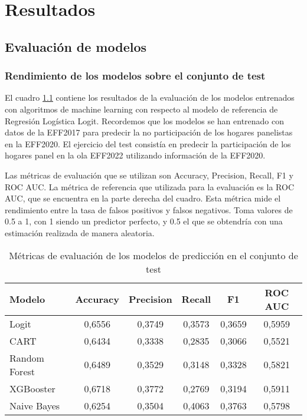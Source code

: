 \chapter{Resultados}
\label{chapter:resultados}

\section{Evaluación de modelos}
\label{section:evaluation_models}

\subsection*{Rendimiento de los modelos sobre el conjunto de test}
El cuadro \ref{table:test} contiene los resultados de la evaluación de los modelos entrenados con algoritmos de machine learning con respecto al modelo de referencia de Regresión Logística Logit. Recordemos que los modelos se han entrenado con datos de la EFF2017 para predecir la no participación de los hogares panelistas en la EFF2020. El ejercicio del test consistía en predecir la participación de los hogares panel en la ola EFF2022 utilizando información de la EFF2020.

Las métricas de evaluación que se utilizan son Accuracy, Precision, Recall, F1 y ROC AUC. La métrica de referencia que utilizada para la evaluación es la ROC AUC, que se encuentra en la parte derecha del cuadro. Esta métrica mide el rendimiento entre la tasa de falsos positivos y falsos negativos. Toma valores de 0.5 a 1, con 1 siendo un predictor perfecto, y 0.5 el que se obtendría con una estimación realizada de manera aleatoria.

\begin{table}[ht]
    \centering
    \begin{tabular}{lccccc}
    \hline
        \textbf{Modelo} & \textbf{Accuracy} & \textbf{Precision} & \textbf{Recall} & \textbf{F1} & \textbf{ROC AUC} \\ \hline
        Logit & 0,6556 & 0,3749 & 0,3573 & 0,3659 & 0,5959 \\ 
        CART & 0,6434 & 0,3338 & 0,2835 & 0,3066 & 0,5521 \\ 
        Random Forest & 0,6489 & 0,3529 & 0,3148 & 0,3328 & 0,5821 \\ 
        XGBooster & 0,6718 & 0,3772 & 0,2769 & 0,3194 & 0,5911 \\ 
        Naive Bayes & 0,6254 & 0,3504 & 0,4063 & 0,3763 & 0,5798 \\ \hline
    \end{tabular}
    \caption{Métricas de evaluación de los modelos de predicción en el conjunto de test}
    \label{table:test}
\end{table}

